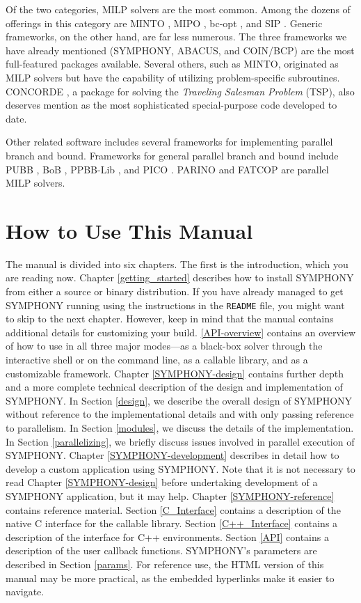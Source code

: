 Of the two categories, MILP solvers are the most common. Among the dozens of
offerings in this category are MINTO \cite{MINTO}, MIPO \cite{MIPO}, bc-opt
\cite{bc-opt}, and SIP \cite{SIP}. Generic frameworks, on the other hand, are
far less numerous. The three frameworks we have already mentioned (SYMPHONY,
ABACUS, and COIN/BCP) are the most full-featured packages available. Several
others, such as MINTO, originated as MILP solvers but have the capability of
utilizing problem-specific subroutines. CONCORDE \cite{concorde, concorde2}, a
package for solving the {\em Traveling Salesman Problem} (TSP), also deserves
mention as the most sophisticated special-purpose code developed to date.

Other related software includes several frameworks for implementing parallel
branch and bound. Frameworks for general parallel branch and bound include
PUBB \cite{PUBB}, BoB \cite{BoB}, PPBB-Lib \cite{PPBB-Lib}, and PICO
\cite{PICO}. PARINO \cite{PARINO} and FATCOP \cite{chen:fatcop2} are parallel
MILP solvers.

\section{How to Use This Manual}

The manual is divided into six chapters. The first is the introduction, which
you are reading now. Chapter \ref{getting_started} describes how to install
SYMPHONY from either a source or binary distribution. If you have already
managed to get SYMPHONY running using the instructions in the \texttt{README}
file, you might want to skip to the next chapter. However, keep in mind that
the manual contains additional details for customizing your build.
\ref{API-overview} contains an overview of how to use in all three major
modes---as a black-box solver through the interactive shell or on the command
line, as a callable library, and as a customizable framework. Chapter
\ref{SYMPHONY-design} contains further depth and a more complete technical
description of the design and implementation of SYMPHONY. In Section
\ref{design}, we describe the overall design of SYMPHONY without reference to
the implementational details and with only passing reference to parallelism.
In Section \ref{modules}, we discuss the details of the implementation. In
Section \ref{parallelizing}, we briefly discuss issues involved in parallel
execution of SYMPHONY. Chapter \ref{SYMPHONY-development} describes in detail
how to develop a custom application using SYMPHONY. Note that it is not
necessary to read Chapter \ref{SYMPHONY-design} before undertaking development
of a SYMPHONY application, but it may help. Chapter \ref{SYMPHONY-reference}
contains reference material. Section \ref{C_Interface} contains a description
of the native C interface for the callable library. Section
\ref{C++_Interface} contains a description of the interface for C++
environments. Section \ref{API} contains a description of the user callback
functions. SYMPHONY's parameters are described in Section \ref{params}. For
reference use, the HTML version of this manual may be more practical, as the
embedded hyperlinks make it easier to navigate.
